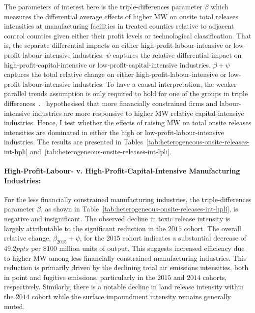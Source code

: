 \documentclass[12pt, english]{article}
\begin{document}
    The parameters of interest here is the triple-differences parameter $\beta$ which measures the differential average effects of higher MW on onsite total releases intensities at manufacturing facilities in treated counties relative to adjacent control counties given either their profit levels or technological classification. That is, the separate differential impacts on either high-profit-labour-intensive or low-profit-labour-intensive industries. $\psi$ captures the relative differential impact on high-profit-capital-intensive or low-profit-capital-intensive industries. $\beta + \psi$ captures the total relative change on either high-profit-labour-intensive or low-profit-labour-intensive industries. To have a causal interpretation, the weaker parallel trends assumption is only required to hold for one of the groups in triple differences~\parencite{olden2022triple}.~\cite{zhang2023unintended} hypothesised that more financially constrained firms and labour-intensive industries are more responsive to higher MW relative capital-intensive industries. Hence, I test whether the effects of raising MW on total onsite releases intensities are dominated in either the high or low-profit-labour-intensive industries. The results are presented in Tables~\ref{tab:heterogeneous-onsite-releases-int-hpli} and~\ref{tab:heterogeneous-onsite-releases-int-lpli}.

    \paragraph{High-Profit-Labour- v. High-Profit-Capital-Intensive Manufacturing Industries:}
    For the less financially constrained manufacturing industries, the triple-differences parameter $\beta$, as shown in Table~\ref{tab:heterogeneous-onsite-releases-int-hpli}, is negative and insignificant. The observed decline in toxic release intensity is largely attributable to the significant reduction in the $2015$ cohort. The overall relative change, $\beta_{2015} + \psi$, for the $2015$ cohort indicates a substantial decrease of $49.2ppts$ per $\$100$ million units of output. This suggests increased efficiency due to higher MW among less financially constrained manufacturing industries. This reduction is primarily driven by the declining total air emissions intensities, both in point and fugitive emissions, particularly in the $2015$ and $2014$ cohorts, respectively. Similarly, there is a notable decline in land release intensity within the $2014$ cohort while the surface impoundment intensity remains generally muted.
    
\end{document}
